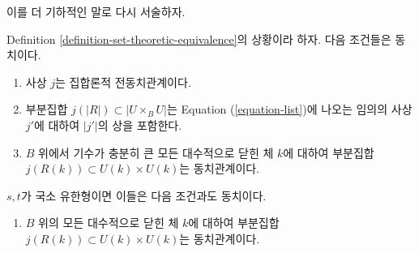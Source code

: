 \noindent
이를 더 기하적인 말로 다시 서술하자.

\begin{lemma}
\label{lemma-set-theoretic-pre-equivalence-geometric}
Definition \ref{definition-set-theoretic-equivalence}의 상황이라 하자.
다음 조건들은 동치이다.
\begin{enumerate}
\item 사상 $j$는 집합론적 전동치관계이다.
\item 부분집합 $j(|R|) \subset |U \times_B U|$는 Equation
(\ref{equation-list})에 나오는 임의의 사상 $j'$에 대하여
$|j'|$의 상을 포함한다.
\item $B$ 위에서 기수가 충분히 큰 모든 대수적으로 닫힌 체 $k$에 대하여
부분집합 $j(R(k)) \subset U(k) \times U(k)$는 동치관계이다.
\end{enumerate}
$s, t$가 국소 유한형이면 이들은 다음 조건과도 동치이다.
\begin{enumerate}
\item[(4)] $B$ 위의 모든 대수적으로 닫힌 체 $k$에 대하여
부분집합 $j(R(k)) \subset U(k) \times U(k)$는 동치관계이다.
\end{enumerate}
\end{lemma}

